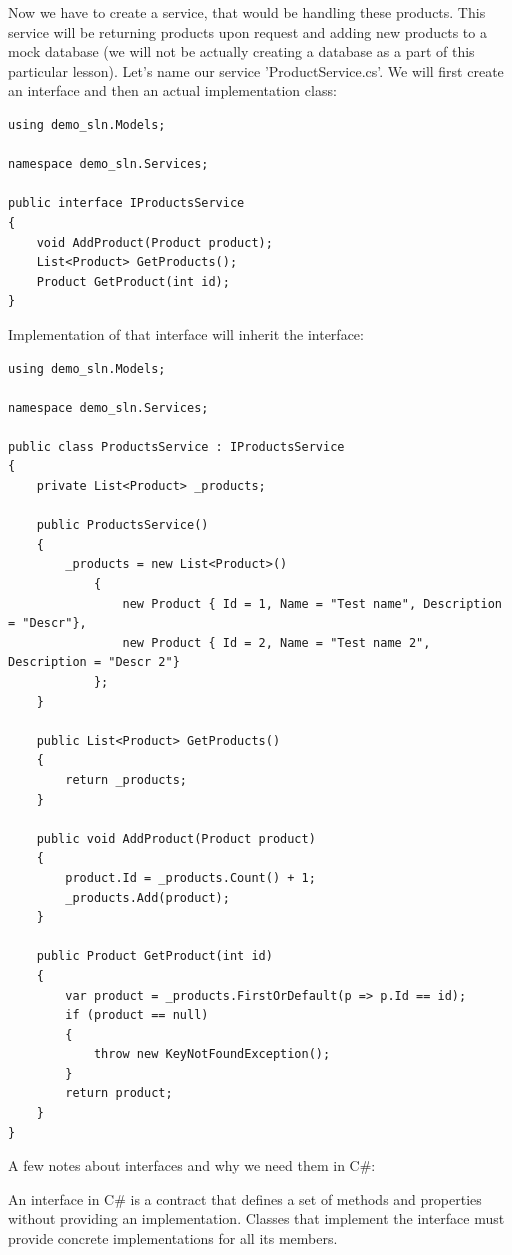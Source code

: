 Now we have to create a service, that would be handling these products. This service will be returning products upon request and adding new products to a mock database (we will not be actually creating a database as a part of this particular lesson). Let's name our service 'ProductService.cs'. We will first create an interface and then an actual implementation class:

\begin{lstlisting}
using demo_sln.Models;

namespace demo_sln.Services;

public interface IProductsService
{
    void AddProduct(Product product);
    List<Product> GetProducts();
    Product GetProduct(int id);
}

\end{lstlisting}

Implementation of that interface will inherit the interface:

\begin{lstlisting}
using demo_sln.Models;

namespace demo_sln.Services;

public class ProductsService : IProductsService
{
    private List<Product> _products;

    public ProductsService()
    {
        _products = new List<Product>()
            {
                new Product { Id = 1, Name = "Test name", Description = "Descr"},
                new Product { Id = 2, Name = "Test name 2", Description = "Descr 2"}
            };
    }

    public List<Product> GetProducts()
    {
        return _products;
    }

    public void AddProduct(Product product)
    {
        product.Id = _products.Count() + 1;
        _products.Add(product);
    }

    public Product GetProduct(int id)
    {
        var product = _products.FirstOrDefault(p => p.Id == id);
        if (product == null)
        {
            throw new KeyNotFoundException();
        }
        return product;
    }
}

\end{lstlisting}

A few notes about interfaces and why we need them in C\#:

An interface in C\# is a contract that defines a set of methods and properties without providing an implementation. Classes that implement the interface must provide concrete implementations for all its members.

